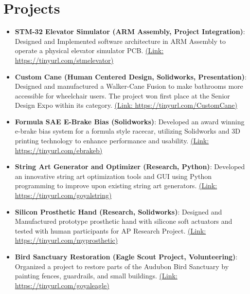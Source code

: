 \documentclass[letterpaper,10pt]{article}
\newcommand{\resumeItem}[2]{
  \item\small{
    \textbf{#1}{: #2 \vspace{-2pt}}
  }
}
\newcommand{\resumeSubItem}[2]{\resumeItem{#1}{#2}\vspace{-3pt}}
\newcommand{\resumeSubHeadingListStart}{\begin{itemize}[leftmargin=*]}
\newcommand{\resumeSubHeadingListEnd}{\end{itemize}}
\begin{document}
\section{Projects}
  \resumeSubHeadingListStart
    \resumeSubItem{STM-32 Elevator Simulator (ARM Assembly, Project Integration)}
    {Designed and Implemented software architecture in ARM Assembly to operate a physical elevator simulator PCB. \href{https://tinyurl.com/stmelevator}{(Link: https://tinyurl.com/stmelevator)}}
\vspace{2pt}
    \resumeSubItem{Custom Cane (Human Centered Design, Solidworks, Presentation)}
    {Designed and manufactured a Walker-Cane Fusion to make bathrooms more accessible for wheelchair users. The project won first place at the Senior Design Expo within its category. \href{https://tinyurl.com/CustomCane}{(Link: https://tinyurl.com/CustomCane)}}
\vspace{2pt}
    \resumeSubItem{Formula SAE E-Brake Bias (Solidworks)}
    {Developed an award winning e-brake bias system for a formula style racecar, utilizing Solidworks and 3D printing technology to enhance performance and usability.  \href{https://tinyurl.com/ebrakeb}{(Link: https://tinyurl.com/ebrakeb)}}
\vspace{2pt}
    \resumeSubItem{String Art Generator and Optimizer (Research, Python)}
    {Developed an innovative string art optimization tools and GUI using Python programming to improve upon existing string art generators. \href{https://tinyurl.com/goyalstring}{(Link: https://tinyurl.com/goyalstring)}}
\vspace{2pt}
    \resumeSubItem{Silicon Prosthetic Hand (Research, Solidworks)}
    {Designed and Manufactured prototype prosthetic hand with silicone soft actuators and tested with human participants for AP Research Project. \href{https://tinyurl.com/myprosthetic}{(Link: https://tinyurl.com/myprosthetic)}}
\vspace{2pt}
    \resumeSubItem{Bird Sanctuary Restoration (Eagle Scout Project, Volunteering)}
    {Organized a project to restore parts of the Audubon Bird Sanctuary by painting fences, guardrails, and small buildings. \href{https://tinyurl.com/goyaleagle}{(Link: https://tinyurl.com/goyaleagle)}}
  \resumeSubHeadingListEnd
\vspace{-5pt}
\end{document}
